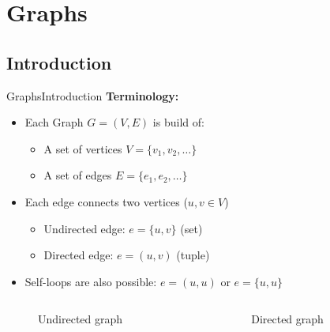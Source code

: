 \section{Graphs}
\subsection{Introduction}

\begin{frame}{Graphs}{Introduction}
  \textbf{Terminology:}
  \begin{itemize}
    \item
      Each Graph {\color{Mittel-Blau}$G = (V, E)$} is build of:
      \begin{itemize}
        \item
          A set of vertices {\color{Mittel-Blau}$V = \{v_1, v_2, \dotsc\}$}
        \item
          A set of edges {\color{Mittel-Blau}$E = \{e_1, e_2, \dotsc\}$}
       \end{itemize}
     \item
       Each edge connects two vertices
       ({\color{Mittel-Blau}$u, v \in V$})
       \begin{itemize}
         \item
           Undirected edge: {\color{Mittel-Blau}$e = \{u, v\}$} (set)
         \item
           Directed edge: {\color{Mittel-Blau}$e = (u, v)$} (tuple)
        \end{itemize}
      \item
        Self-loops are also possible:
        {\color{Mittel-Blau}$e = (u, u)$} or
        {\color{Mittel-Blau}$e = \{u, u\}$}
  \end{itemize}
  \vspace{-1.0em}
  \begin{columns}
    \begin{column}[b]{0.5\linewidth}
      \begin{figure}
        \begin{adjustbox}{width=0.75\linewidth}
          
        \end{adjustbox}
        \caption{Undirected graph}
        \label{fig:graphs:introduction_undirected}
      \end{figure}
    \end{column}
    \begin{column}[b]{0.5\linewidth}
      \begin{figure}
        \begin{adjustbox}{width=0.75\linewidth}
          
        \end{adjustbox}
        \vspace{-1.0em}
        \caption{Directed graph}
        \label{fig:graphs:introduction_directed}
      \end{figure}
    \end{column}
  \end{columns}
\end{frame}

